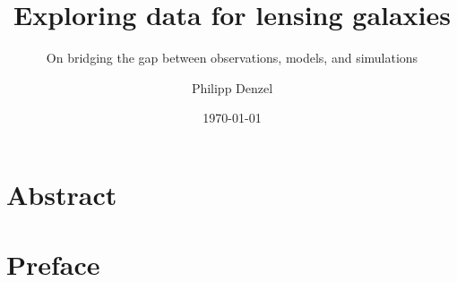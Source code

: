 \documentclass[
    fontsize=10pt,
    twoside=true,
    numbers=noenddot,
]{cls/phdbyphd}
\begin{document}
% 

\titlehead{Doctoral Dissertation}

\subject{Doctoral Dissertation}
\title[Exploring data for lensing galaxies]{
    Exploring data for lensing galaxies
}
\subtitle{On bridging the gap between observations, models, and simulations}

\author[Philipp Denzel]{Philipp Denzel}
\date{\today}
\publishers{University of Z\"urich}

\frontmatter

\dedication{
	For the one who will never read it.\\
	\flushright -- Philipp Denzel
}

\maketitle


\chapter*{Abstract}
    

\chapter*{Preface}
    

\begingroup

    \setlength{\textheight}{23cm}
    \etocstandarddisplaystyle
    \etocstandardlines

    \tableofcontents

    \listoffigures

    \let\cleardoublepage\bigskip
    \let\clearpage\bigskip
\end{document}
